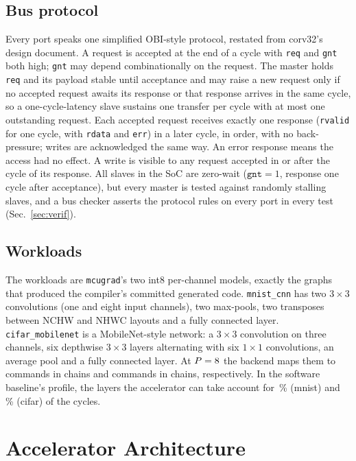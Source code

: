 \documentclass[journal]{IEEEtran}
\newcommand{\code}[1]{\texttt{#1}}
\begin{document}
\subsection{Bus protocol}
Every port speaks one simplified OBI-style protocol, restated from corv32's design document. A request is accepted at the end of a cycle with \code{req} and \code{gnt} both high; \code{gnt} may depend combinationally on the request. The master holds \code{req} and its payload stable until acceptance and may raise a new request only if no accepted request awaits its response or that response arrives in the same cycle, so a one-cycle-latency slave sustains one transfer per cycle with at most one outstanding request. Each accepted request receives exactly one response (\code{rvalid} for one cycle, with \code{rdata} and \code{err}) in a later cycle, in order, with no back-pressure; writes are acknowledged the same way. An error response means the access had no effect. A write is visible to any request accepted in or after the cycle of its response. All slaves in the SoC are zero-wait ($\code{gnt}=1$, response one cycle after acceptance), but every master is tested against randomly stalling slaves, and a bus checker asserts the protocol rules on every port in every test (Sec.~\ref{sec:verif}).

\subsection{Workloads}
The workloads are \texttt{mcugrad}'s two int8 per-channel models, exactly the graphs that produced the compiler's committed generated code. \texttt{mnist\_cnn} has two $3\times3$ convolutions (one and eight input channels), two max-pools, two transposes between NCHW and NHWC layouts and a fully connected layer. \texttt{cifar\_mobilenet} is a MobileNet-style network: a $3\times3$ convolution on three channels, six depthwise $3\times3$ layers alternating with six $1\times1$ convolutions, an average pool and a fully connected layer. At $P=8$ the backend maps them to \PredCommandsMnistPeight{} commands in \PredChainsMnistPeight{} chains and \PredCommandsCifarPeight{} commands in \PredChainsCifarPeight{} chains, respectively. In the software baseline's profile, the layers the accelerator can take account for \ProfileAccelShareMnist\,\% (mnist) and \ProfileAccelShareCifar\,\% (cifar) of the cycles.

\section{Accelerator Architecture}\label{sec:arch}
\end{document}
